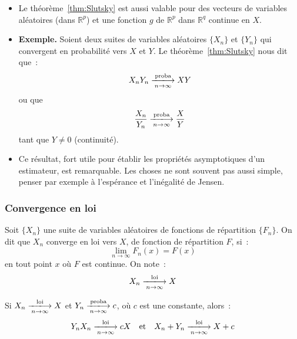\documentclass[10pt]{beamer}
\begin{document}
\begin{notes}

  \begin{itemize}

  \item Le théorème~\ref{thm:Slutsky} est aussi valable pour des vecteurs de variables aléatoires (dans $\mathbb R^p$) et une fonction $g$ de $\mathbb R^p$ dans $\mathbb R^q$ continue en $X$.\newline

  \item \textbf{Exemple.} Soient deux suites de variables aléatoires $\{X_n\}$ et $\{Y_n\}$ qui convergent en probabilité vers $X$ et $Y$. Le théorème~\ref{thm:Slutsky} nous dit que~:
    \[
      X_nY_n \xlongrightarrow[n\rightarrow\infty]{\text{proba}} XY
    \]
    ou que
    \[
      \frac{X_n}{Y_n} \xlongrightarrow[n\rightarrow\infty]{\text{proba}} \frac{X}{Y}
    \]
    tant que $Y\neq 0$ (continuité).\newline

  \item Ce résultat, fort utile pour établir les propriétés asymptotiques d'un estimateur, est remarquable. Les choses ne sont souvent pas aussi simple, penser par exemple à l'espérance et l'inégalité de Jensen.

  \end{itemize}

\end{notes}

\begin{frame}
  \frametitle{Convergence en loi}

  \begin{defn}{}
    Soit $\{X_n\}$ une suite de variables aléatoires de fonctions de
    répartition $\{F_n\}$. On dit que $X_n$ converge en loi vers $X$, de
    fonction de répartition $F$, si~:
    \[
      \underset{n\rightarrow\infty}{\lim} F_n(x) = F(x)
    \]
    en tout point $x$ où $F$ est continue. On note~:
    \[
      X_n \xlongrightarrow[n\rightarrow\infty]{\text{loi}} X
    \]
  \end{defn}

  \bigskip

  \begin{theorem}[Slutsky]\label{thm:Slutsky:mixte}
    Si $X_n \xlongrightarrow[n\rightarrow\infty]{\text{loi}} X$ et
    $Y_n \xlongrightarrow[n\rightarrow\infty]{\text{proba}} c$, où $c$ est une
    constante, alors~:
    \[
      Y_nX_n \xlongrightarrow[n\rightarrow\infty]{\text{loi}} cX
      \quad\text{et}\quad
      X_n+Y_n \xlongrightarrow[n\rightarrow\infty]{\text{loi}} X+c
    \]
  \end{theorem}

\end{frame}
\end{document}
